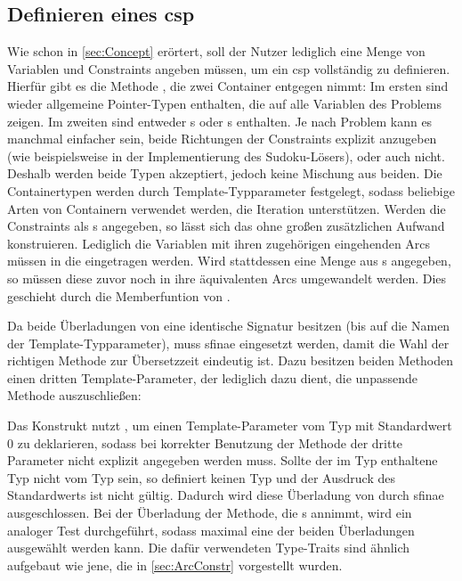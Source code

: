 \subsection{Definieren eines \ac*{csp}}
Wie schon in \cref{sec:Concept} erörtert, soll der Nutzer lediglich eine Menge von Variablen und Constraints angeben müssen, um ein \ac*{csp} vollständig zu definieren. Hierfür
gibt es die Methode , die zwei Container entgegen nimmt: Im ersten sind wieder allgemeine Pointer-Typen enthalten, die auf alle Variablen des Problems zeigen.
Im zweiten sind entweder s oder s enthalten. Je nach Problem kann es manchmal einfacher sein, beide Richtungen der Constraints explizit
anzugeben (wie beispielsweise in der Implementierung des Sudoku-Lösers), oder auch nicht. Deshalb werden beide Typen akzeptiert, jedoch keine Mischung aus beiden. Die Containertypen
werden durch Template-Typparameter festgelegt, sodass beliebige Arten von Containern verwendet werden, die Iteration unterstützen. Werden die Constraints als s
angegeben, so lässt sich das  ohne großen zusätzlichen Aufwand konstruieren. Lediglich die Variablen mit ihren zugehörigen eingehenden Arcs müssen in die
 eingetragen werden. Wird stattdessen eine Menge aus s angegeben, so müssen diese zuvor noch in ihre äquivalenten Arcs
umgewandelt werden. Dies geschieht durch die Memberfuntion  von .

Da beide Überladungen von  eine identische Signatur besitzen (bis auf die Namen der Template-Typparameter), muss \ac*{sfinae} eingesetzt werden, damit
die Wahl der richtigen Methode zur Übersetzzeit eindeutig ist. Dazu besitzen beiden Methoden einen dritten Template-Parameter, der lediglich dazu dient, die unpassende Methode
auszuschließen:

Das Konstrukt nutzt , um einen Template-Parameter vom Typ  mit Standardwert 0 zu deklarieren, sodass bei korrekter Benutzung der Methode
der dritte Parameter nicht explizit angegeben werden muss. Sollte der im Typ  enthaltene Typ nicht vom Typ  sein, so definiert
 keinen Typ und der Ausdruck des Standardwerts ist nicht gültig. Dadurch wird diese Überladung von  durch \ac*{sfinae}
ausgeschlossen. Bei der Überladung der Methode, die s annimmt, wird ein analoger Test durchgeführt, sodass maximal eine der beiden Überladungen ausgewählt
werden kann. Die dafür verwendeten Type-Traits sind ähnlich aufgebaut wie jene, die in \cref{sec:ArcConstr} vorgestellt wurden.